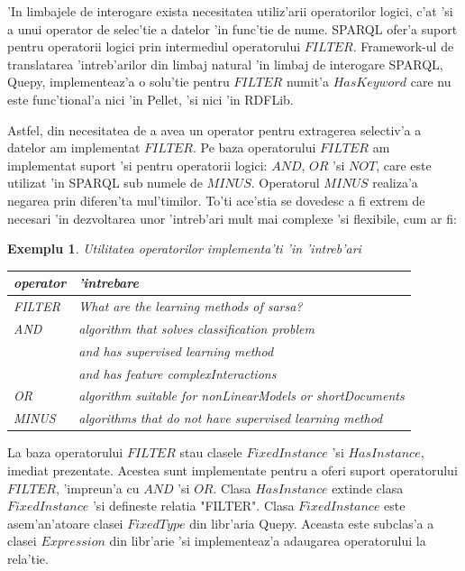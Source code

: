 \documentclass[12pt,a4paper,twoside]{report}
\newtheorem{example}{Exemplu}
\begin{document}
'In limbajele de interogare exista necesitatea utiliz'arii operatorilor logici, c'at 'si a unui operator de selec'tie a datelor 'in func'tie de nume. SPARQL ofer'a suport pentru operatorii logici prin intermediul operatorului $FILTER$. Framework-ul de translatarea  'intreb'arilor din limbaj natural 'in limbaj de interogare SPARQL, Quepy, implementeaz'a o solu'tie pentru $FILTER$ numit'a $HasKeyword$ care nu este func'tional'a nici 'in Pellet, 'si nici 'in RDFLib. 

Astfel, din necesitatea de a avea un operator pentru extragerea selectiv'a a datelor am implementat $FILTER$. Pe baza operatorului $FILTER$ am implementat suport 'si pentru operatorii logici: $AND$, $OR$ 'si $NOT$, care este utilizat 'in SPARQL sub numele de $MINUS$. Operatorul $MINUS$ realiza'a negarea prin diferen'ta mul'timilor. To'ti ace'stia se dovedesc a fi extrem de necesari 'in dezvoltarea unor 'intreb'ari mult mai complexe 'si flexibile, cum ar fi:


  
  \begin{example} Utilitatea operatorilor implementa'ti 'in 'intreb'ari
  
 \begin{center}
      \begin{tabular}{ll}
      operator & 'intrebare\\ \hline
      
  {\it FILTER } & What are the learning methods of sarsa?\\
  {\it AND} & algorithm that solves classification problem \\
            & and has supervised learning method \\
            & and has feature complexInteractions \\
  {\it OR } & algorithm suitable for nonLinearModels or shortDocuments\\
  {\it MINUS} & algorithms that do not have supervised learning method\\
       \end{tabular}
       \end{center}
        \vspace{0.3cm}
   \end{example}

La baza operatorului $FILTER$ stau clasele $FixedInstance$ 'si $HasInstance$, imediat prezentate. Acestea sunt implementate pentru a oferi suport operatorului $FILTER$, 'impreun'a cu $AND$ 'si $OR$. Clasa $HasInstance$ extinde clasa $FixedInstance$ 'si defineste relatia "FILTER". Clasa $FixedInstance$ este asem'an'atoare clasei $FixedType$ din libr'aria Quepy. Aceasta este subclas'a a clasei $Expression$ din libr'arie 'si implementeaz'a adaugarea operatorului la rela'tie. 
\end{document}
